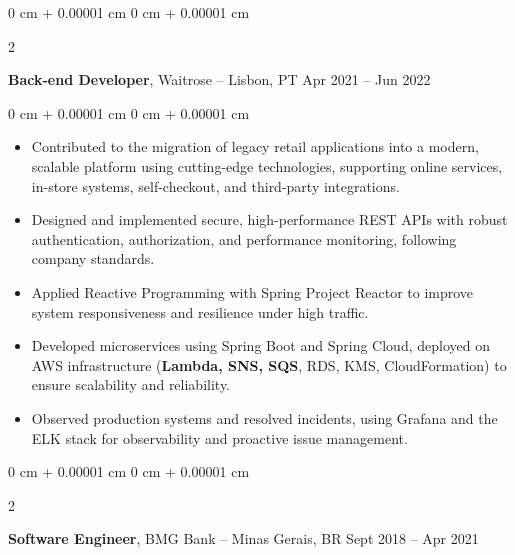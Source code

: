 \documentclass[10pt, letterpaper]{article}
\newenvironment{highlights}{
    \begin{itemize}[
        topsep=0.10 cm,
        parsep=0.10 cm,
        partopsep=0pt,
        itemsep=0pt,
        leftmargin=0 cm + 10pt
    ]
}{
    \end{itemize}
} %
\newenvironment{onecolentry}{
    \begin{adjustwidth}{
        0 cm + 0.00001 cm
    }{
        0 cm + 0.00001 cm
    }
}{
    \end{adjustwidth}
} %
\newenvironment{twocolentry}[2][]{
    \onecolentry
    \def\secondColumn{#2}
    \setcolumnwidth{\fill, 4.5 cm}
    \begin{paracol}{2}
}{
    \switchcolumn \raggedleft \secondColumn
    \end{paracol}
    \endonecolentry
} %
\begin{document}
        \vspace{0.2 cm}

        \begin{twocolentry}{
            Apr 2021 – Jun 2022
        }
            \textbf{Back-end Developer}, Waitrose -- Lisbon, PT\end{twocolentry}

        \vspace{0.10 cm}
        
        \begin{onecolentry}
            \begin{highlights}
                \item Contributed to the migration of legacy retail applications into a modern, scalable platform using cutting-edge technologies, supporting online services, in-store systems, self-checkout, and third-party integrations.
                \item Designed and implemented secure, high-performance REST APIs with robust authentication, authorization, and performance monitoring, following company standards.
                \item Applied Reactive Programming with Spring Project Reactor to improve system responsiveness and resilience under high traffic.
                \item Developed microservices using Spring Boot and Spring Cloud, deployed on AWS infrastructure (\textbf{Lambda, SNS, SQS}, RDS, KMS, CloudFormation) to ensure scalability and reliability.
                \item Observed production systems and resolved incidents, using Grafana and the ELK stack for observability and proactive issue management.
            \end{highlights}
        \end{onecolentry}
        
        \vspace{0.2 cm}
        
        \begin{twocolentry}{
            Sept 2018 – Apr 2021
        }
            \textbf{Software Engineer}, BMG Bank -- Minas Gerais, BR\end{twocolentry}

        \vspace{0.10 cm}
        
\end{document}

